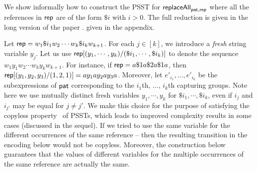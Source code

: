 We show informally how to construct the PSST for $\mathsf{replaceAll}_{\mathsf{pat}, \mathsf{rep}}$ where all the references in $\mathsf{rep}$ are of the form $\$i$ with $i > 0$.
The full reduction is
\ifproceeding given in the long version of the paper \cite{popl22-full}.
\else given in the appendix. \fi

Let $\mathsf{rep} = w_1 \$i_1 w_2 \cdots w_k \$i_k w_{k+1}$. For each $j \in [k]$, we introduce a \emph{fresh} string variable $y_{j}$.
Let us use $\mathsf{rep}[(y_1, \cdots, y_k)/(\$i_1,\cdots, \$i_k)]$ to denote the sequence $w_1 y_1 w_2 \cdots w_k y_k w_{k+1}$.
%
For instance, if $\mathsf{rep} = a \$1 a \$2 a \$1 a$, then
$\mathsf{rep}[(y_1, y_2, y_3)/(1,2, 1)] = a y_1 a y_2 a y_3 a$.
%
Moreover, let $e'_{i_1},\ldots, e'_{i_k}$ be the subexpressions of $\mathsf{pat}$ corresponding to the $i_1$th, $\ldots$, $i_k$th capturing groups.
Note here we use mutually distinct fresh variables $y_1, \cdots, y_k$ for $\$i_1, \cdots, \$i_k$, even if $i_j$ and $i_{j'}$ may be equal for $j \neq j'$.
%
We make this choice for the purpose of satisfying the copyless property~\cite{AC10} of PSSTs, which leads to improved complexity results in some cases (discussed in the sequel).
If we tried to use the same variable for the different occurrences of the same reference – then the resulting transition in the encoding below would not be copyless.
Moreover, the construction below guarantees that the values of different variables for the multiple occurrences of the same reference are actually the same.





